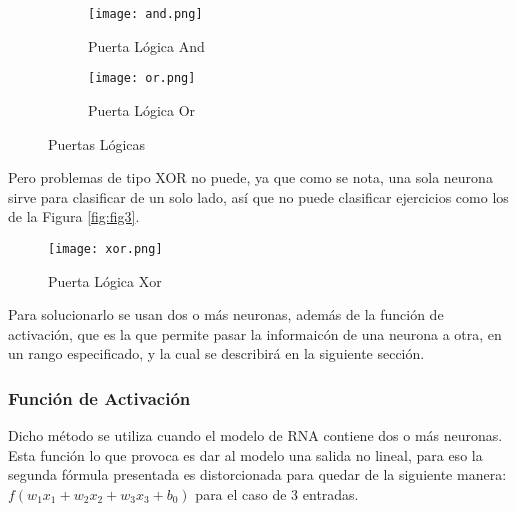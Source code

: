         \begin{figure}[H]
            \begin{subfigure}[H]{0.49\textwidth}
                \texttt{[image: and.png]}
                \caption{Puerta L\'ogica And}
                \label{fig:f1}
            \end{subfigure}
            \hfill
            \begin{subfigure}[H]{0.49\textwidth}
                \texttt{[image: or.png]}
                \caption{Puerta L\'ogica Or}
                \label{fig:f2}  %
            \end{subfigure}
            \caption{Puertas L\'ogicas}
        \end{figure}
        
        Pero problemas de tipo XOR no puede, ya que como se nota, una sola neurona sirve para 
        clasificar de un solo lado, así que no puede clasificar ejercicios
        como los de la Figura \eqref{fig:fig3}.

        \begin{figure}[H]
            \centering
            \texttt{[image: xor.png]}
            \caption{Puerta L\'ogica Xor}
            \label{fig:fig3}
        \end{figure}

        Para solucionarlo se usan dos o m\'as neuronas, adem\'as de la funci\'on de activaci\'on, que es la que permite pasar la informaicón de una neurona a otra, en un rango especificado, y la cual se describirá en la siguiente sección.

            \subsubsection{Funci\'on de Activaci\'on} \label{sec: activation}
            
            
                Dicho m\'etodo se utiliza cuando el modelo de RNA contiene dos o m\'as neuronas.
                Esta funci\'on lo que provoca es dar al modelo una salida no lineal, para 
                eso la segunda f\'ormula presentada es distorcionada para quedar de la siguiente 
                manera: $f( w_1x_1 + w_2x_2 + w_3x_3 + b_0)$ para el caso de 3 entradas.              
                

